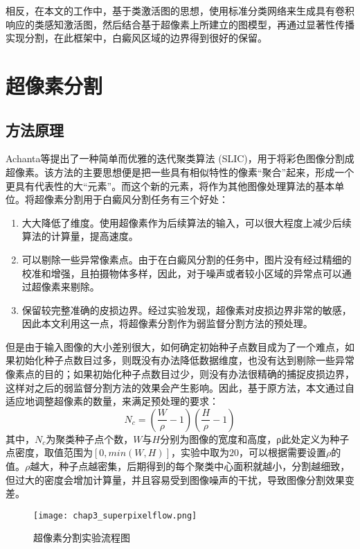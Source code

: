 相反，在本文的工作中，基于类激活图\cite{zhou2018weakly,huang2018weakly}的思想，使用标准分类网络来生成具有卷积响应的类感知激活图，然后结合基于超像素上所建立的图模型，再通过显著性传播实现分割，在此框架中，白癜风区域的边界得到很好的保留。
\section{超像素分割}\label{sec:SLIC}
\subsection{方法原理}
Achanta等\cite{achanta2012slic}提出了一种简单而优雅的迭代聚类算法 (SLIC)，用于将彩色图像分割成超像素。该方法的主要思想便是把一些具有相似特性的像素“聚合”起来，形成一个更具有代表性的大“元素”。而这个新的元素，将作为其他图像处理算法的基本单位。将超像素分割用于白癜风分割任务有三个好处：
\begin{enumerate}
\item 大大降低了维度。使用超像素作为后续算法的输入，可以很大程度上减少后续算法的计算量，提高速度。
\item 可以剔除一些异常像素点。由于在白癜风分割的任务中，图片没有经过精细的校准和增强，且拍摄物体多样，因此，对于噪声或者较小区域的异常点可以通过超像素来剔除。
\item 保留较完整准确的皮损边界。经过实验发现，超像素对皮损边界非常的敏感，因此本文利用这一点，将超像素分割作为弱监督分割方法的预处理。
\end{enumerate}

但是由于输入图像的大小差别很大，如何确定初始种子点数目成为了一个难点，如果初始化种子点数目过多，则既没有办法降低数据维度，也没有达到剔除一些异常像素点的目的；如果初始化种子点数目过少，则没有办法很精确的捕捉皮损边界，这样对之后的弱监督分割方法的效果会产生影响。因此，基于原方法，本文通过自适应地调整超像素的数量，来满足预处理的要求：
\begin{equation}
\label{eq:Nc}
N_{c}=\left(\frac{W}{\rho}-1\right)\left(\frac{H}{\rho}-1\right)
\end{equation}
其中，$N_c$为聚类种子点个数，$W$与$H$分别为图像的宽度和高度，ρ此处定义为种子点密度，取值范围为$[0,min⁡(W,H)]$，实验中取为$20$，可以根据需要设置$\rho$的值。$\rho$越大，种子点越密集，后期得到的每个聚类中心面积就越小，分割越细致，但过大的密度会增加计算量，并且容易受到图像噪声的干扰，导致图像分割效果变差。

\begin{figure}[htbp]
\begin{center}
\texttt{[image: chap3\_superpixelflow.png]}
\end{center}
\caption{超像素分割实验流程图}
\label{fig:chap3_superpixelflow}
\end{figure}

